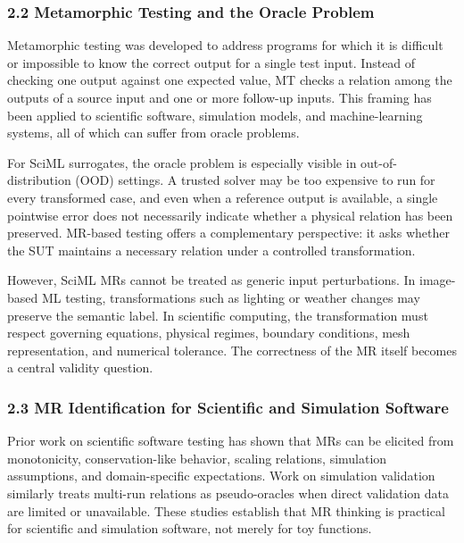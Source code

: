 \subsubsection{2.2 Metamorphic Testing and the Oracle
Problem}\label{metamorphic-testing-and-the-oracle-problem}

Metamorphic testing was developed to address programs for which it is
difficult or impossible to know the correct output for a single test
input. Instead of checking one output against one expected value, MT
checks a relation among the outputs of a source input and one or more
follow-up inputs. This framing has been applied to scientific software,
simulation models, and machine-learning systems, all of which can suffer
from oracle problems.

For SciML surrogates, the oracle problem is especially visible in
out-of-distribution (OOD) settings. A trusted solver may be too
expensive to run for every transformed case, and even when a reference
output is available, a single pointwise error does not necessarily
indicate whether a physical relation has been preserved. MR-based
testing offers a complementary perspective: it asks whether the SUT
maintains a necessary relation under a controlled transformation.

However, SciML MRs cannot be treated as generic input perturbations. In
image-based ML testing, transformations such as lighting or weather
changes may preserve the semantic label. In scientific computing, the
transformation must respect governing equations, physical regimes,
boundary conditions, mesh representation, and numerical tolerance. The
correctness of the MR itself becomes a central validity question.

\subsubsection{2.3 MR Identification for Scientific and Simulation
Software}\label{mr-identification-for-scientific-and-simulation-software}

Prior work on scientific software testing has shown that MRs can be
elicited from monotonicity, conservation-like behavior, scaling
relations, simulation assumptions, and domain-specific expectations.
Work on simulation validation similarly treats multi-run relations as
pseudo-oracles when direct validation data are limited or unavailable.
These studies establish that MR thinking is practical for scientific and
simulation software, not merely for toy functions.

